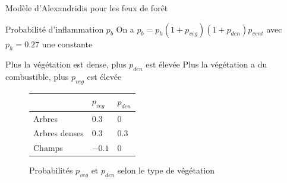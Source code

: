 \documentclass{beamer}
\begin{document}
\begin{frame}{Modèle d'Alexandridis pour les feux de forêt \hyperlink{jump}{\beamerbutton{ }} \hypertarget{8}{\beamerbutton{ }}}
    \begin{block}{Probabilité d'inflammation $p_b$}
        On a $p_b = p_h (1 + p_{veg}) (1 + p_{den}) p_{vent}$ avec $p_h = 0.27$ une constante
    \end{block}

    Plus la végétation est dense, plus $p_{den}$ est élevée
    Plus la végétation a du combustible, plus $p_{veg}$ est élevée

    \begin{figure}[!h]
        \centering
        \renewcommand{\arraystretch}{2}
        \setlength{\extrarowheight}{-3pt}
        \begin{tabular}{ |>{\centering\arraybackslash}p{4cm}|>{\centering\arraybackslash}p{2cm}|>{\centering\arraybackslash}p{2cm}| }
            \cline{2-3}
            \multicolumn{1}{c|}{} & $p_{veg}$ & $p_{den}$ \\
            \hline 
            Arbres & $0.3$ & $0$ \\ 
            \hline
            Arbres denses & $0.3$ & $0.3$ \\ 
            \hline
            Champs & $-0.1$ & $0$ \\
            \hline 
        \end{tabular}
        \caption{Probabilités $p_{veg}$ et $p_{den}$ selon le type de végétation}
    \end{figure}
\end{frame}
\end{document}
